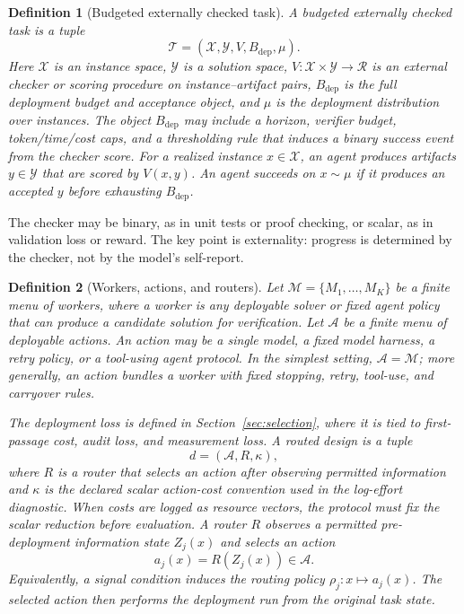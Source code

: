 \documentclass{article}
\newtheorem{definition}{Definition}
\newcommand{\cA}{\mathcal{A}}
\newcommand{\cM}{\mathcal{M}}
\newcommand{\cT}{\mathcal{T}}
\newcommand{\cX}{\mathcal{X}}
\newcommand{\cY}{\mathcal{Y}}
\begin{document}
\begin{definition}[Budgeted externally checked task]
\label{def:checked-task}
\label{def:task}
A budgeted externally checked task is a tuple
\[
\cT=(\cX,\cY,V,B_{\mathrm{dep}},\mu).
\]
Here $\cX$ is an instance space, $\cY$ is a solution space,
$V:\cX\times\cY\to\mathcal R$ is an external checker or scoring procedure on instance--artifact pairs,
$B_{\mathrm{dep}}$ is the full deployment budget and acceptance object,
and $\mu$ is the deployment distribution over instances.
The object $B_{\mathrm{dep}}$ may include a horizon, verifier budget, token/time/cost caps, and a thresholding rule that induces a binary success event from the checker score.
For a realized instance $x\in\cX$, an agent produces artifacts $y\in\cY$ that are scored by $V(x,y)$.
An agent succeeds on $x\sim\mu$ if it produces an accepted $y$ before exhausting $B_{\mathrm{dep}}$.
\end{definition}

The checker may be binary, as in unit tests or proof checking, or scalar, as in validation loss or reward.
The key point is externality: progress is determined by the checker, not by the model's self-report.

\begin{definition}[Workers, actions, and routers]
\label{def:actions-router}
\label{def:design}
Let $\cM=\{M_1,\ldots,M_K\}$ be a finite menu of workers, where a worker is any deployable solver or fixed agent policy that can produce a candidate solution for verification.
Let $\mathcal A$ be a finite menu of deployable actions.
An action may be a single model, a fixed model harness, a retry policy, or a tool-using agent protocol.
In the simplest setting, $\cA=\cM$; more generally, an action bundles a worker with fixed stopping, retry, tool-use, and carryover rules.

The deployment loss is defined in Section~\ref{sec:selection}, where it is tied to first-passage cost, audit loss, and measurement loss.
A routed design is a tuple
\[
d=(\cA,R,\kappa),
\]
where $R$ is a router that selects an action after observing permitted information and $\kappa$ is the declared scalar action-cost convention used in the log-effort diagnostic.
When costs are logged as resource vectors, the protocol must fix the scalar reduction before evaluation.
A router $R$ observes a permitted pre-deployment information state $Z_j(x)$ and selects an action
\[
a_j(x)=R(Z_j(x))\in\mathcal A.
\]
Equivalently, a signal condition induces the routing policy $\rho_j:x\mapsto a_j(x)$.
The selected action then performs the deployment run from the original task state.
\end{definition}
\end{document}
